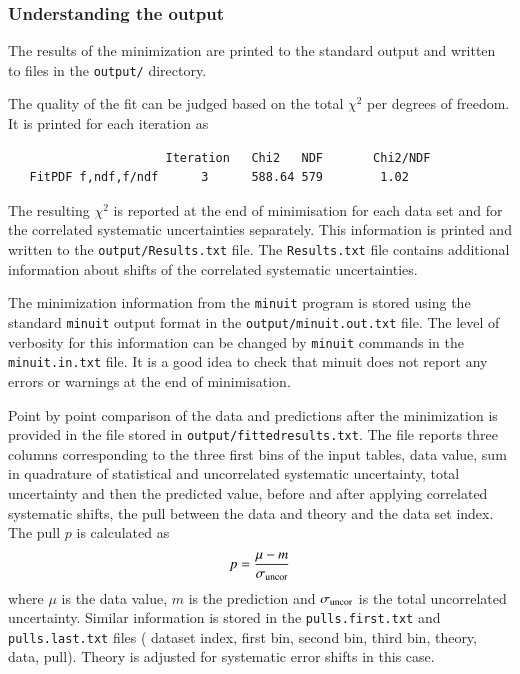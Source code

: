 \subsubsection{Understanding the output}
  The results of the minimization are printed to the standard output and written
  to files in the {\tt output/} directory. 

  The quality of the fit can be judged based on the total $\chi^2$ per degrees of freedom.
  It is printed for each iteration as 
\begin{verbatim}
                      Iteration   Chi2   NDF       Chi2/NDF
   FitPDF f,ndf,f/ndf      3      588.64 579        1.02
\end{verbatim}
  The resulting $\chi^2$ is reported at the end of minimisation for each data set and for the correlated 
  systematic uncertainties separately. This information is printed and written
  to the {\tt output/Results.txt} file. The {\tt Results.txt} file contains additional 
  information about shifts of the correlated systematic uncertainties.

  The minimization information from the {\tt minuit} program is stored using the standard {\tt minuit} output format in the {\tt output/minuit.out.txt}
  file. The level of verbosity for this information can be changed by {\tt minuit} commands
  in the {\tt minuit.in.txt} file. 
  It is a good idea to check that minuit does not report any errors
  or warnings at the end of minimisation.
  
  Point by point comparison of the data and predictions after the minimization 
  is provided in the file stored in {\tt output/fittedresults.txt}. The file reports three columns
  corresponding to the three first bins of the input tables, data value, sum in 
  quadrature of statistical and uncorrelated systematic uncertainty, total
  uncertainty and then the predicted value, before and after applying correlated systematic shifts,
  the pull between the  data and theory and 
  the data set index. The pull $p$ is calculated as 
  \begin{equation}
      p = \frac{ \mu - m} {\sigma_{\rm uncor}}
  \end{equation}
  where $\mu$ is the data value, $m$ is the prediction and $\sigma_{\rm uncor}$ is the total
  uncorrelated uncertainty.
  Similar information is stored in the {\tt pulls.first.txt} and {\tt pulls.last.txt} files
  ( dataset index, first bin, second bin, third bin, theory, data, pull).
  Theory is  adjusted for systematic error shifts in this case.


